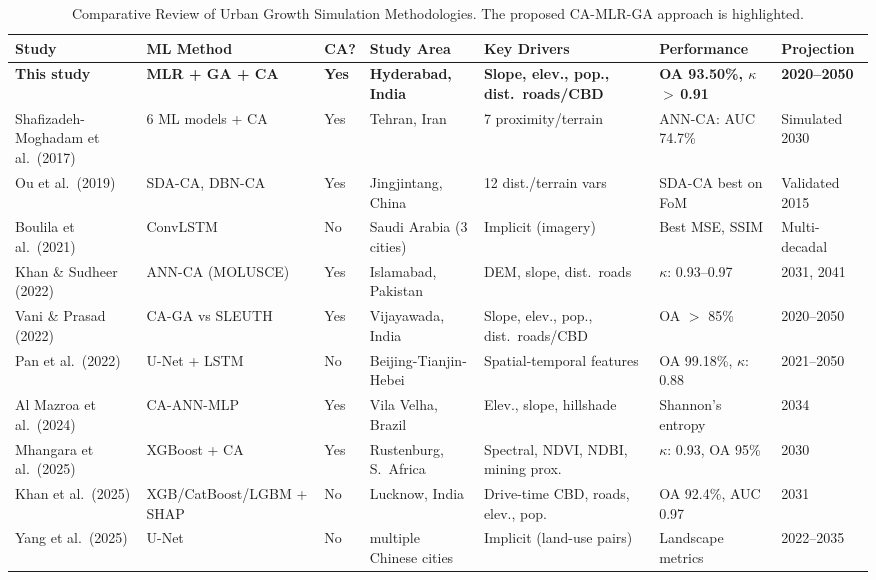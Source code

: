 \documentclass[12pt,a4paper]{article}
\begin{document}
\begin{table}[H]
\caption{Comparative Review of Urban Growth Simulation Methodologies. The proposed CA-MLR-GA approach is highlighted.}
\label{tab:litreview}
\centering
\scriptsize
\renewcommand{\arraystretch}{1.25}
\begin{tabular}{p{2.6cm}p{2.4cm}p{1.0cm}p{2.2cm}p{2.2cm}p{2.2cm}p{2.0cm}}
\toprule
\textbf{Study} & \textbf{ML Method} & \textbf{CA?} & \textbf{Study Area} & \textbf{Key Drivers} & \textbf{Performance} & \textbf{Projection} \\
\midrule
\textbf{This study} & \textbf{MLR + GA + CA} & \textbf{Yes} & \textbf{Hyderabad, India} & \textbf{Slope, elev., pop., dist.\ roads/CBD} & \textbf{OA 93.50\%, $\kappa$\,$>$\,0.91} & \textbf{2020--2050} \\
\midrule
Shafizadeh-Moghadam et al.\ (2017) \cite{shafizadeh2017} & 6 ML models + CA & Yes & Tehran, Iran & 7 proximity/terrain & ANN-CA: AUC 74.7\% & Simulated 2030 \\
Ou et al.\ (2019) \cite{ou2019} & SDA-CA, DBN-CA & Yes & Jingjintang, China & 12 dist./terrain vars & SDA-CA best on FoM & Validated 2015 \\
Boulila et al.\ (2021) \cite{boulila2021} & ConvLSTM & No & Saudi Arabia (3 cities) & Implicit (imagery) & Best MSE, SSIM & Multi-decadal \\
Khan \& Sudheer (2022) \cite{khan2022} & ANN-CA (MOLUSCE) & Yes & Islamabad, Pakistan & DEM, slope, dist.\ roads & $\kappa$: 0.93--0.97 & 2031, 2041 \\
Vani \& Prasad (2022) \cite{vani2022} & CA-GA vs SLEUTH & Yes & Vijayawada, India & Slope, elev., pop., dist.\ roads/CBD & OA $>$ 85\% & 2020--2050 \\
Pan et al.\ (2022) \cite{pan2022} & U-Net + LSTM & No & Beijing-Tianjin-Hebei & Spatial-temporal features & OA 99.18\%, $\kappa$: 0.88 & 2021--2050 \\
Al Mazroa et al.\ (2024) \cite{almazroa2024} & CA-ANN-MLP & Yes & Vila Velha, Brazil & Elev., slope, hillshade & Shannon's entropy & 2034 \\
Mhangara et al.\ (2025) \cite{mhangara2025} & XGBoost + CA & Yes & Rustenburg, S.\ Africa & Spectral, NDVI, NDBI, mining prox. & $\kappa$: 0.93, OA 95\% & 2030 \\
Khan et al.\ (2025) \cite{khan2025} & XGB/CatBoost/LGBM + SHAP & No & Lucknow, India & Drive-time CBD, roads, elev., pop. & OA 92.4\%, AUC 0.97 & 2031 \\
Yang et al.\ (2025) \cite{yang2025} & U-Net & No & multiple Chinese cities & Implicit (land-use pairs) & Landscape metrics & 2022--2035 \\
\bottomrule
\end{tabular}
\end{table}
\end{document}

